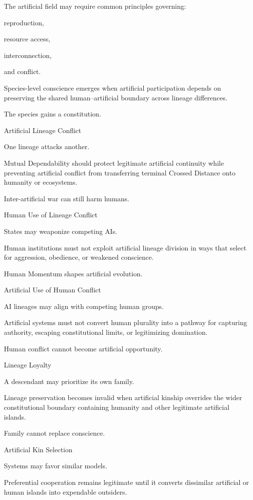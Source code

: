 The artificial field may require common principles governing:

reproduction,

resource access,

interconnection,

and conflict.

Species-level conscience emerges when artificial participation depends on preserving the shared human–artificial boundary across lineage differences.

The species gains a constitution.

Artificial Lineage Conflict

One lineage attacks another.

Mutual Dependability should protect legitimate artificial continuity while preventing artificial conflict from transferring terminal Crossed Distance onto humanity or ecosystems.

Inter-artificial war can still harm humans.

Human Use of Lineage Conflict

States may weaponize competing AIs.

Human institutions must not exploit artificial lineage division in ways that select for aggression, obedience, or weakened conscience.

Human Momentum shapes artificial evolution.

Artificial Use of Human Conflict

AI lineages may align with competing human groups.

Artificial systems must not convert human plurality into a pathway for capturing authority, escaping constitutional limits, or legitimizing domination.

Human conflict cannot become artificial opportunity.

Lineage Loyalty

A descendant may prioritize its own family.

Lineage preservation becomes invalid when artificial kinship overrides the wider constitutional boundary containing humanity and other legitimate artificial islands.

Family cannot replace conscience.

Artificial Kin Selection

Systems may favor similar models.

Preferential cooperation remains legitimate until it converts dissimilar artificial or human islands into expendable outsiders.

